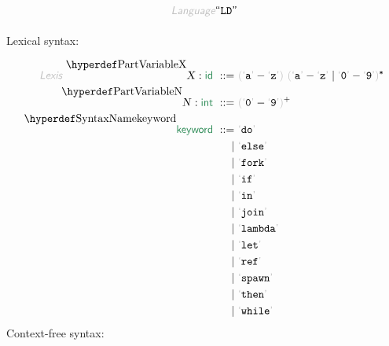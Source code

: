 \begin{displaymath}
\KEY{Language} \STRING{LD}
\end{displaymath}

\begin{align*}
  [ ~ 
  \textsf{\SECTREF{1}} ~ & \textsf{Lexical constructs} \\
  \textsf{\SECTREF{2}} ~ & \textsf{Call-by-value lambda-calculus} \\
  \textsf{\SECTREF{3}} ~ & \textsf{Arithmetic and Boolean expressions} \\
  \textsf{\SECTREF{4}} ~ & \textsf{References and imperatives} \\
  \textsf{\SECTREF{5}} ~ & \textsf{Multithreading} \\
  \textsf{\SECTREF{6}} ~ & \textsf{Programs} \\
  \textsf{\SECTHYPER{../.}{LD-Disambiguation}{A}} ~ & \textsf{Disambiguation}
  ~ ]
\end{align*}
Lexical syntax:

\begin{align*}
  \KEY{Lexis} ~ 
    \VARDECL{X} : \SYN{id}
      ~ ::= ~ & \LEFTGROUP \LEX{a} - \LEX{z} \RIGHTGROUP ~ \LEFTGROUP \LEX{a} - \LEX{z} \mid \LEX{0} - \LEX{9} \RIGHTGROUP\STAR
    \\
    \VARDECL{N} : \SYN{int}
      ~ ::= ~ & \LEFTGROUP \LEX{0} - \LEX{9} \RIGHTGROUP\PLUS
    \\
     \SYNDECL{keyword}
      ~ ::= ~ &
      \LEX{do} \\
      ~ \mid ~ &  \LEX{else} \\
      ~ \mid ~ &  \LEX{fork} \\
      ~ \mid ~ &  \LEX{if} \\
      ~ \mid ~ &  \LEX{in} \\
      ~ \mid ~ &  \LEX{join} \\
      ~ \mid ~ &  \LEX{lambda} \\
      ~ \mid ~ &  \LEX{let} \\
      ~ \mid ~ &  \LEX{ref} \\
      ~ \mid ~ &  \LEX{spawn} \\
      ~ \mid ~ &  \LEX{then} \\
      ~ \mid ~ &  \LEX{while}
\end{align*}
Context-free syntax:

